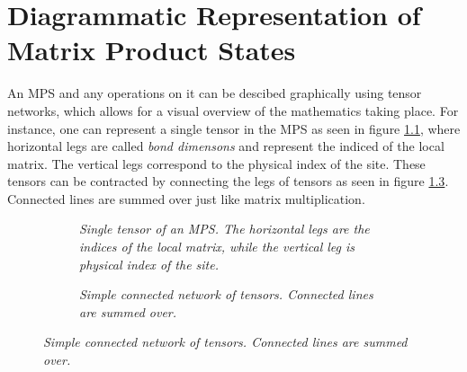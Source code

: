 \chapter{Diagrammatic Representation of Matrix Product States}

An MPS and any operations on it can be descibed graphically using tensor networks, which allows for a visual overview of the mathematics taking place. For instance, one can represent a single tensor in the MPS as seen in figure \ref{fig:singleTensor}, where horizontal legs are called \textit{bond dimensons} and represent the indiced of the local matrix. The vertical legs correspond to the physical index of the site. These tensors can be contracted by connecting the legs of tensors as seen in figure \ref{fig:simpleConnected}. Connected lines are summed over just like matrix multiplication. 

\begin{figure}[h!]
	\centering
	\begin{subfigure}{\linewidth}
		\centering
		
		\caption{\textit{Single tensor of an MPS. The horizontal legs are the indices of the local matrix, while the vertical leg is physical index of the site.}}
		\label{fig:singleTensor}
	\end{subfigure}
	\begin{subfigure}{\linewidth}
		\centering
		
		\caption{\textit{Simple connected network of tensors. Connected lines are summed over.}}
		\label{fig:simpleConnected}
	\end{subfigure}
	
\end{figure}
